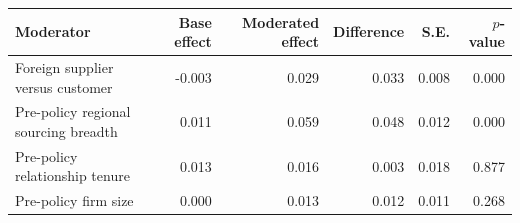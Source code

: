 \begin{tabular}{lrrrrr}
\toprule
Moderator & Base effect & Moderated effect & Difference & S.E. & $p$-value \\
\midrule
Foreign supplier versus customer & -0.003 & 0.029 & 0.033 & 0.008 & 0.000 \\
Pre-policy regional sourcing breadth & 0.011 & 0.059 & 0.048 & 0.012 & 0.000 \\
Pre-policy relationship tenure & 0.013 & 0.016 & 0.003 & 0.018 & 0.877 \\
Pre-policy firm size & 0.000 & 0.013 & 0.012 & 0.011 & 0.268 \\
\bottomrule
\end{tabular}